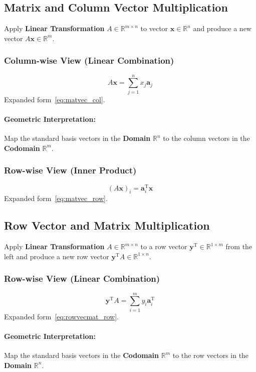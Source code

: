 \documentclass{article}
\begin{document}
\subsection{Matrix and Column Vector Multiplication}
Apply \textbf{Linear Transformation} $A \in \mathbb{R}^{m \times n}$ to vector $\mathbf{x} \in \mathbb{R}^n$ and produce a new vector $A\mathbf{x} \in \mathbb{R}^m$.

\subsubsection{Column-wise View (Linear Combination)}
\[
    A\mathbf{x} = \sum_{j=1}^n x_j \mathbf{a}_j
\]
Expanded form~\ref{eq:matvec_col}.
\paragraph{Geometric Interpretation:} Map the standard basis vectors in the \textbf{Domain} $\mathbb{R}^n$ to the column vectors in the \textbf{Codomain} $\mathbb{R}^m$.

\subsubsection{Row-wise View (Inner Product)}
\[
    (A\mathbf{x})_i = \mathbf{a}_i^{\mathrm{T}} \mathbf{x}
\]
Expanded form~\ref{eq:matvec_row}.

\subsection{Row Vector and Matrix Multiplication}
Apply \textbf{Linear Transformation} $A \in \mathbb{R}^{m \times n}$ to a row vector $\mathbf{y}^{\mathrm{T}} \in \mathbb{R}^{1 \times m}$ from the left and produce a new row vector $\mathbf{y}^{\mathrm{T}} A \in \mathbb{R}^{1 \times n}$.

\subsubsection{Row-wise View (Linear Combination)}
\[
    \mathbf{y}^{\mathrm{T}} A = \sum_{i=1}^m y_i \mathbf{a}_i^{\mathrm{T}}
\]
Expanded form~\ref{eq:rowvecmat_row}.
\paragraph{Geometric Interpretation:} Map the standard basis vectors in the \textbf{Codomain} $\mathbb{R}^m$ to the row vectors in the \textbf{Domain} $\mathbb{R}^n$.
\end{document}
